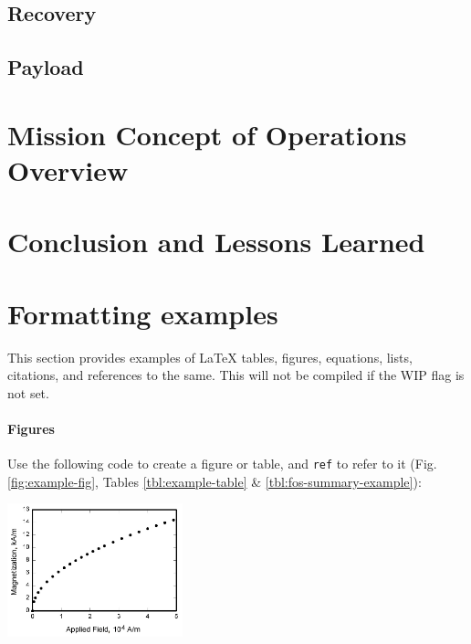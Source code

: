 \documentclass[report]{sac}
\newif\ifwip
\renewenvironment{figure}{\comment}{\endcomment}
\newcommand\putdescription[1]
{
	\ifwip
		\begingroup
		\small\em
		#1
		\endgroup
	\fi
}
\begin{document}
	\subsection{Recovery} \label{recovery}

	\subsection{Payload} \label{payload}
 
	\section{Mission Concept of Operations Overview} \label{conops}
 
	\putdescription{\CONOPSDescription}

	\section{Conclusion and Lessons Learned}
	\putdescription{\ConclusionDescription}

	\pagebreak
	\appendix

	\ifwip
		\section*{Formatting examples}

		This section provides examples of \LaTeX{} tables, figures, equations,
		lists, citations, and references to the same. This will not be compiled if
		the WIP flag is not set.

		\paragraph{Figures} Use the following code to create a figure or table, and
		\verb|ref| to refer to it (Fig. \ref{fig:example-fig}, Tables
		\ref{tbl:example-table} \& \ref{tbl:fos-summary-example}):

		\begin{figure}[H]
			\centering
			\includegraphics[width=2in]{fig/graph.jpg} %
			\caption{Magentization as a function of applied fields} 
			\label{fig:example-fig} %
		\end{figure}
\end{document}
